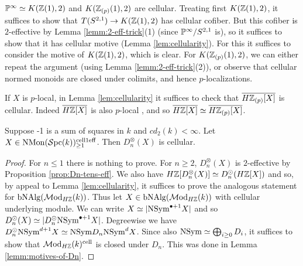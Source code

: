 \documentclass{amsart}
\renewcommand{\NB}[1]{}
\numberwithin{proposition}{section}
\numberwithin{equation}{section}
\def\cell{\mathrm{cell}}
\def\NSym{\mathrm{NSym}}
\def\NMon{\mathrm{NMon}}
\def\bNAlg{\mathrm{bNAlg}}
\def\hotimes{\odot}
\begin{document}
\begin{example} \label{ex:K1-cellular}
$\P^\infty \wequi K(\Z(1),2)$ and $K(\Z_{(p)}(1),2)$ are cellular.
Treating first $K(\Z(1),2)$, it suffices to show that $T(S^{2,1}) \to K(\Z(1),2)$ has cellular cofiber.
But this cofiber is $2$-effective by Lemma \ref{lemm:2-eff-trick}(1) (since $\P^\infty/S^{2,1}$ is), so it suffices to show that it has cellular motive (Lemma \ref{lem:cellularity}).
For this it suffices to consider the motive of $K(\Z(1),2)$, which is clear.
For $K(\Z_{(p)}(1),2)$, we can either repeat the argument (using Lemma \ref{lemm:2-eff-trick}(2)), or observe that cellular normed monoids are closed under colimits, and hence $p$-localizations.
\end{example}

\begin{remark} \label{rmk:cell-p-loc}
If $X$ is $p$-local, in Lemma \ref{lem:cellularity} it suffices to check that $\overline{H\Z_{(p)}[X]}$ is cellular.
Indeed $\overline{H\Z[X]}$ is also $p$-local \cite[Proposition~2.2.16]{freudenthal}, and so $\overline{H\Z[X]} \wequi \overline{H\Z_{(p)}[X]}$.
\end{remark}

\begin{proposition} \label{prop:Dn-cellular}
Suppose -1 is a sum of squares in $k$ and $cd_2(k) < \infty$.\NB{surely the first assumption is actually unnecessary. the second also is, but more effort here}
Let $X \in \NMon(\Spc(k))^{\cell 1 \eff}_{\ge 1}$.
Then $D_n^\otimes(X)$ is cellular.
\end{proposition}
\begin{proof}
For $n \le 1$ there is nothing to prove.
For $n \ge 2$, $D_n^\otimes(X)$ is $2$-effective by Proposition \ref{prop:Dn-tens-eff}.
We also have $H\Z[D_n^\otimes(X)] \wequi D_n^\hotimes(H\Z[X])$ and so, by appeal to Lemma \ref{lem:cellularity}, it suffices to prove the analogous statement for $\bNAlg(\Mod_{H\Z}(k))$.
Thus let $X \in \bNAlg(\Mod_{H\Z}(k))$ with cellular underlying module.
We can write $X \wequi |\NSym^{\bullet +1} X|$ and so $D_n^\hotimes(X) \wequi |D_n^\hotimes \NSym^{\bullet +1} X|$.
Degreewise we have $D_n^\hotimes \NSym^{d +1} X \wequi \NSym D_n \NSym^{d} X$.
Since also $\NSym \wequi \bigoplus_{i \ge 0} D_i$, it suffices to show that $\Mod_{H\Z}(k)^\cell$ is closed under $D_n$.
This was done in Lemma \ref{lemm:motives-of-Dn}.
\end{proof}
\end{document}
